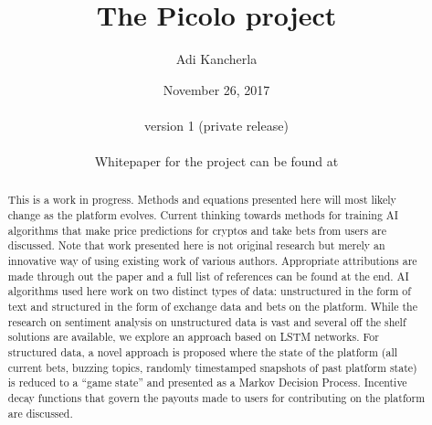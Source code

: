 \documentclass[a4paper]{article}
\begin{document}
\pagecolor{oldlace}

\title{The Picolo project}
\author{Adi Kancherla}
\date{November 26, 2017 \\\hfill \\version 1 (private release) \\\hfill \\Whitepaper for the project can be found at \cite{Picolo_Whitepaper}}
\maketitle
\begin{abstract}
This is a work in progress. Methods and equations presented here will most likely change as the platform evolves. Current thinking towards methods for training AI algorithms that make price predictions for cryptos and take bets from users are discussed. Note that work presented here is not original research but merely an innovative way of using existing work of various authors. Appropriate attributions are made through out the paper and a full list of references can be found at the end. AI algorithms used here work on two distinct types of data: unstructured in the form of text and structured in the form of exchange data and bets on the platform. While the research on sentiment analysis on unstructured data is vast and several off the shelf solutions are available, we explore an approach based on LSTM networks. For structured data, a novel approach is proposed where the state of the platform (all current bets, buzzing topics, randomly timestamped snapshots of past platform state) is reduced to a “game state” and presented as a Markov Decision Process. Incentive decay functions that govern the payouts made to users for contributing on the platform are discussed. 
\end{abstract}


\end{document}
